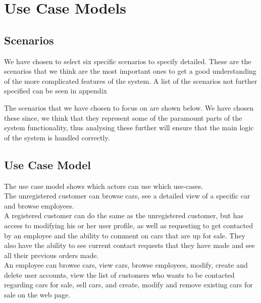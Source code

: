\section{Use Case Models}

\subsection{Scenarios}
We have chosen to select six specific scenarios to specify detailed. These are the scenarios that we think are the most important ones to get a good understanding of the more complicated features of the system. A list of the scenarios not further specified can be seen in appendix %

The scenarios that we have chosen to focus on are shown below. We have chosen these since, we think that they represent some of the paramount parts of the system functionality, thus analysing these further will ensure that the main logic of the system is handled correctly.













\subsection{Use Case Model}
The use case model shows which actors can use which use-cases.\\

The unregistered customer can browse cars, see a detailed view of a specific car and browse employees.\\
A registered customer can do the same as the unregistered customer, but has access to modifying his or her user profile, as well as requesting to get contacted by an employee and the ability to comment on cars that are up for sale.
They also have the ability to see current contact requests that they have made and see all their previous orders made.\\

An employee can browse cars, view cars, browse employees, modify, create and delete user accounts, view the list of customers who wants to be contacted regarding cars for sale, sell cars, and create, modify and remove existing cars for sale on the web page.\\

